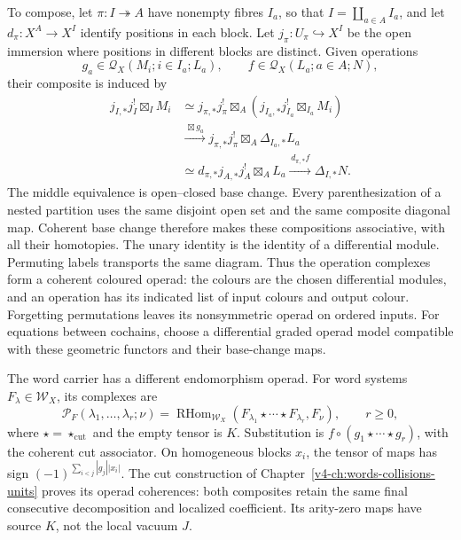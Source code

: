 To compose, let \(\pi:I\twoheadrightarrow A\) have nonempty
fibres \(I_a\), so that \(I=\coprod_{a\in A}I_a\), and let
\(d_\pi:X^A\to X^I\) identify positions in each block.
Let \(j_\pi:U_\pi\hookrightarrow X^I\) be the open immersion
where positions in different blocks are distinct. Given operations
\[
 g_a\in\mathcal Q_X(M_i;i\in I_a;L_a),\qquad
 f\in\mathcal Q_X(L_a;a\in A;N),
\]
their composite is induced by
\begin{equation}\label{v4-eq:recognition-chiral-substitution}
 \begin{split}
 j_{I,*}j_I^!\!\mathop{\boxtimes}_I M_i
 &\simeq j_{\pi,*}j_\pi^!
       \mathop{\boxtimes}_A\left(j_{I_a,*}j_{I_a}^!
                                      \!\mathop{\boxtimes}_{I_a}M_i\right)\\
 &\xrightarrow{\,\boxtimes g_a\,}
       j_{\pi,*}j_\pi^!\!\mathop{\boxtimes}_A\Delta_{I_a,*}L_a\\
 &\simeq d_{\pi,*}j_{A,*}j_A^!\!\mathop{\boxtimes}_A L_a
       \xrightarrow{\,d_{\pi,*}f\,}\Delta_{I,*}N.
 \end{split}
\end{equation}
The middle equivalence is open--closed base change. Every
parenthesization of a nested partition uses the same disjoint
open set and the same composite diagonal map. Coherent base
change therefore makes these compositions associative, with all
their homotopies. The unary identity is the identity of a
differential module. Permuting labels transports the same
diagram. Thus the operation complexes form a coherent coloured operad:
the colours are the chosen differential modules, and an
operation has its indicated list of input colours and output
colour. Forgetting permutations leaves its nonsymmetric operad
on ordered inputs. For equations between cochains, choose a
differential graded operad model compatible with these geometric
functors and their base-change maps.

The word carrier has a different endomorphism operad. For word
systems \(F_\lambda\in\mathcal W_X\), its complexes are
\begin{equation}\label{v4-eq:recognition-word-operations}
 \mathcal P_F(\lambda_1,\ldots,\lambda_r;\nu)
   =\operatorname{RHom}_{\mathcal W_X}
       (F_{\lambda_1}\star\cdots\star F_{\lambda_r},F_\nu),
 \qquad r\geq0,
\end{equation}
where \(\star=\star_{\mathrm{cut}}\) and the empty tensor is
\(K\). Substitution is
\(f\circ(g_1\star\cdots\star g_r)\), with the coherent cut
associator. On homogeneous blocks \(x_i\), the tensor of maps
has sign \((-1)^{\sum_{i<j}|g_j||x_i|}\). The cut construction
of Chapter~\ref{v4-ch:words-collisions-units} proves its operad
coherences: both composites retain the same final consecutive
decomposition and localized coefficient. Its arity-zero maps
have source \(K\), not the local vacuum \(J\).

